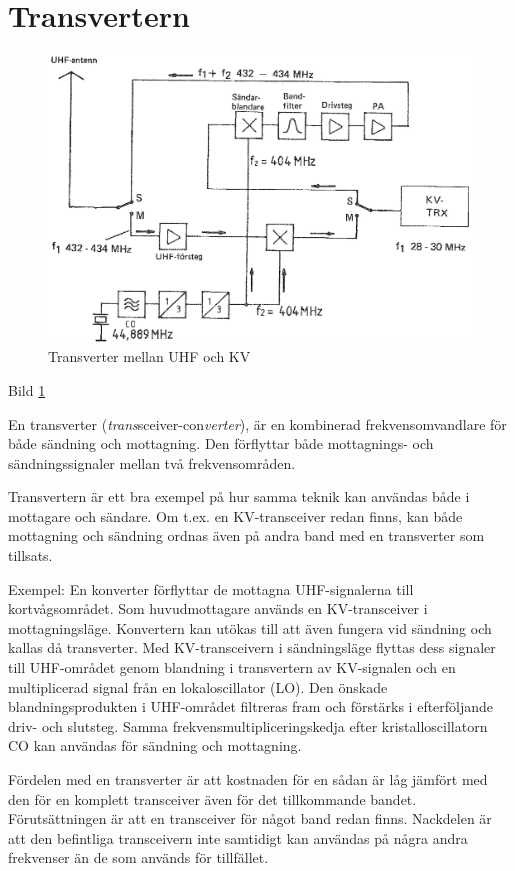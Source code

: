 \section{Transvertern}

\begin{figure}
  \includegraphics[width=\textwidth]{images/bild_2_4-19.png}
  \caption{Transverter mellan UHF och KV}
  \label{fig:bildII4-19}
\end{figure}

Bild \ref{fig:bildII4-19}

En transverter (\emph{trans}sceiver-con\emph{verter}), är en
kombinerad frekvensomvandlare för både sändning och mottagning. Den
förflyttar både mottagnings- och sändningssignaler mellan två
frekvensområden.

Transvertern är ett bra exempel på hur samma teknik kan användas både
i mottagare och sändare. Om t.ex. en KV-transceiver redan finns, kan
både mottagning och sändning ordnas även på andra band med en
transverter som tillsats.

Exempel: En konverter förflyttar de mottagna UHF-signalerna till
kortvågsområdet. Som huvudmottagare används en KV-transceiver i
mottagningsläge. Konvertern kan utökas till att även fungera vid
sändning och kallas då transverter. Med KV-transceivern i
sändningsläge flyttas dess signaler till UHF-området genom blandning
i transvertern av KV-signalen och en multiplicerad signal från en
lokaloscillator (LO). Den önskade blandningsprodukten i
UHF-området filtreras fram och förstärks i efterföljande driv- och
slutsteg. Samma frekvensmultipliceringskedja efter kristalloscillatorn
CO kan användas för sändning och mottagning.

Fördelen med en transverter är att kostnaden för en sådan är låg
jämfört med den för en komplett transceiver även för det tillkommande
bandet. Förutsättningen är att en transceiver för något band redan
finns.  Nackdelen är att den befintliga transceivern inte samtidigt
kan användas på några andra frekvenser än de som används för
tillfället.
